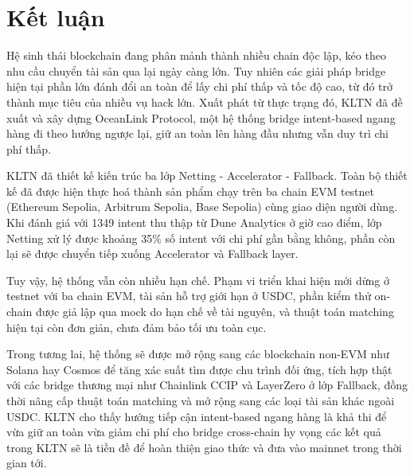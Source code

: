 \chapter*{Kết luận}

Hệ sinh thái blockchain đang phân mảnh thành nhiều chain độc lập, kéo theo nhu
cầu chuyển tài sản qua lại ngày càng lớn. Tuy nhiên các giải pháp bridge hiện
tại phần lớn đánh đổi an toàn để lấy chi phí thấp và tốc độ cao, từ đó trở thành
mục tiêu của nhiều vụ hack lớn. Xuất phát từ thực trạng đó, KLTN đã đề xuất và
xây dựng OceanLink Protocol, một hệ thống bridge intent-based ngang hàng đi theo
hướng ngược lại, giữ an toàn lên hàng đầu nhưng vẫn duy trì chi phí thấp.

KLTN đã thiết kế kiến trúc ba lớp Netting - Accelerator - Fallback. Toàn bộ thiết kế đã được hiện thực hoá thành
sản phẩm chạy trên ba chain EVM testnet (Ethereum Sepolia, Arbitrum Sepolia,
Base Sepolia) cùng giao diện người dùng. Khi đánh giá với 1349 intent thu thập
từ Dune Analytics ở giờ cao điểm, lớp Netting xử lý được khoảng 35\% số intent
với chi phí gần bằng không, phần còn lại sẽ được chuyển tiếp xuống Accelerator
và Fallback layer.

Tuy vậy, hệ thống vẫn còn nhiều hạn chế. Phạm vi triển khai hiện mới dừng ở
testnet với ba chain EVM, tài sản hỗ trợ giới hạn ở USDC, phần kiểm thử on-chain
được giả lập qua mock do hạn chế về tài nguyên, và thuật toán matching hiện tại
còn đơn giản, chưa đảm bảo tối ưu toàn cục.

Trong tương lai, hệ thống sẽ được mở rộng sang các blockchain non-EVM như Solana
hay Cosmos để tăng xác suất tìm được chu trình đối ứng, tích hợp thật với các
bridge thương mại như Chainlink CCIP và LayerZero ở lớp Fallback, đồng thời nâng
cấp thuật toán matching và mở rộng sang các loại tài sản khác ngoài USDC.
KLTN cho thấy hướng tiếp cận intent-based ngang hàng là khả thi để
vừa giữ an toàn vừa giảm chi phí cho bridge cross-chain hy vọng các kết
quả trong KLTN sẽ là tiền đề để hoàn thiện giao thức và đưa vào mainnet trong
thời gian tới.

